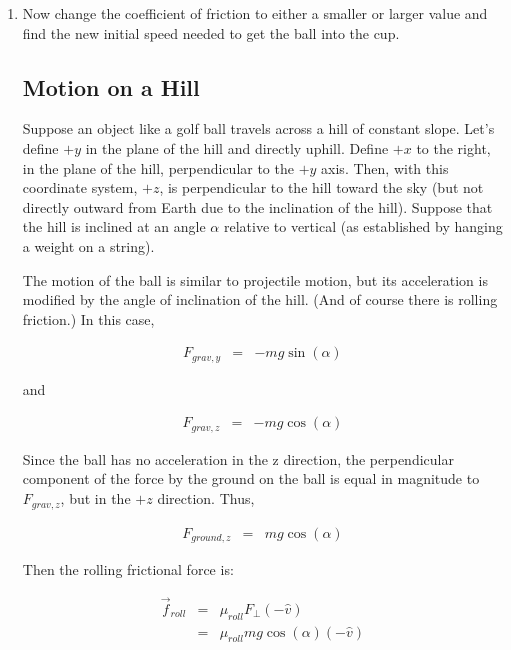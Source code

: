 \begin{enumerate}
\item Now change the coefficient of friction to either a smaller or larger value and find the new initial speed needed to get the ball into the cup.


\subsection*{Motion on a Hill}

Suppose an object like a golf ball travels across a hill of constant slope. Let's define $+y$ in the plane of the hill and directly uphill. Define $+x$ to the right, in the plane of the hill, perpendicular to the $+y$ axis. Then, with this coordinate system, $+z$, is perpendicular to the hill toward the sky (but not directly outward from Earth due to the inclination of the hill). Suppose that the hill is inclined at an angle $\alpha$ relative to vertical (as established by hanging a weight on a string).


The motion of the ball is similar to projectile motion, but its acceleration is modified by the angle of inclination of the hill. (And of course there is rolling friction.) In this case,

\begin{eqnarray*}
	F_{grav,y} &=& -mg\sin(\alpha)
\end{eqnarray*}

and 

\begin{eqnarray*}
	F_{grav,z} &=& -mg\cos(\alpha)
\end{eqnarray*}


Since the ball has no acceleration in the z direction, the perpendicular component of the force by the ground on the ball is equal in magnitude to $F_{grav,z}$, but in the $+z$ direction. Thus,

\begin{eqnarray*}
	F_{ground,z} &=& mg\cos(\alpha)
\end{eqnarray*}

Then the rolling frictional force is:

\begin{eqnarray*}
\vec{f}_{roll} &= &  \mu_{roll} F_{\perp}(-\hat{v}) \\
& = &  \mu_{roll} mg\cos(\alpha)(-\hat{v}) 
\end{eqnarray*}


\end{enumerate}
